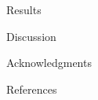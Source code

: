 \documentclass[12pt]{article}
\begin{document}
\begin{section}{Results}
%
%
%
%
%
\end{section}

\begin{section}{Discussion}
\end{section}

\begin{section}{Acknowledgments}
\end{section}

\begin{section}{References}
\end{section}

\newpage
\end{document}
